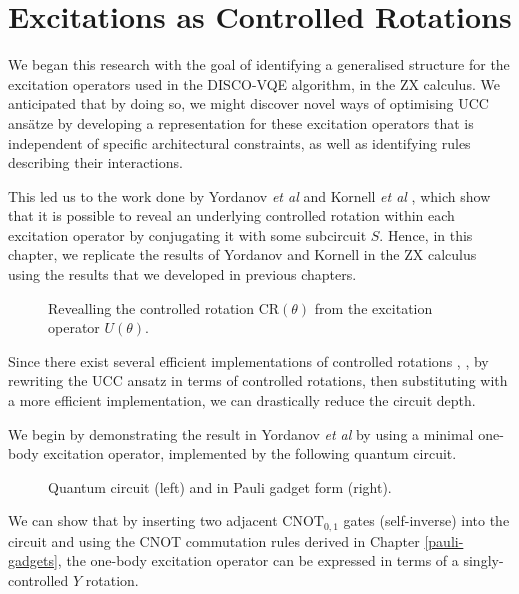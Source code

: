 \section{Excitations as Controlled Rotations}%
\label{operator-controlled-rotations}

We began this research with the goal of identifying a generalised structure for the excitation operators used in the DISCO-VQE algorithm, in the ZX calculus. We anticipated that by doing so, we might discover novel ways of optimising UCC ansätze by developing a representation for these excitation operators that is independent of specific architectural constraints, as well as identifying rules describing their interactions.

This led us to the work done by Yordanov \textit{et al} \cite{Yordanov2020} and Kornell \textit{et al} \cite{Kornell2023}, which show that it is possible to reveal an underlying controlled rotation within each excitation operator by conjugating it with some subcircuit $S$. Hence, in this chapter, we replicate the results of Yordanov and Kornell in the ZX calculus using the results that we developed in previous chapters.

\begin{figure}[H]
    \centering
    \caption{Revealling the controlled rotation CR$(\theta)$ from the excitation operator $U(\theta)$.}
\end{figure}

Since there exist several efficient implementations of controlled rotations \cite{ZomorodiMoghadam2016}, \cite{Ye2006}, by rewriting the UCC ansatz in terms of controlled rotations, then substituting with a more efficient implementation, we can drastically reduce the circuit depth.

We begin by demonstrating the result in Yordanov \textit{et al} by using a minimal one-body excitation operator, implemented by the following quantum circuit.

\begin{figure}[H]
    \centering
    \caption{Quantum circuit (left) and in Pauli gadget form (right).}
\end{figure}

We can show that by inserting two adjacent $\text{CNOT}_{0, 1}$ gates (self-inverse) into the circuit and using the CNOT commutation rules derived in Chapter \ref{pauli-gadgets}, the one-body excitation operator can be expressed in terms of a singly-controlled $Y$ rotation.

